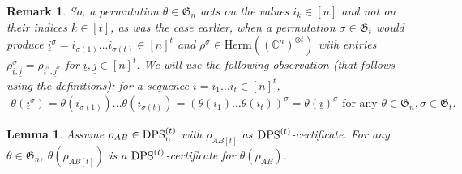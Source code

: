 \documentclass[11pt]{article}
\newcommand{\C}{\ensuremath{\mathbb{C}}} %
\newcommand{\Perm}{\mathfrak G}
\newcommand{\Herm}{\mathrm{Herm}}
\newcommand{\DPS}{\text{\rm DPS}}
\newcommand{\ot}{\otimes}
\newcommand{\ui}{\underline{i}}
\newcommand{\uj}{\underline{j}}
\theoremstyle{plain}
\newtheorem{lemma}[satz]{Lemma}
\newtheorem{remark}[satz]{Remark}
\newcommand{\ML}{\textcolor{blue}}
\begin{document}
\begin{remark}
So, a permutation $\theta\in\Perm_n$ acts on the values $i_k\in [n]$ and {\em not} on their indices  $k\in [t]$, as  was the case earlier, when a permutation $\sigma\in \Perm_{t}$ would produce 
$ \ui^\sigma=i_{\sigma(1)}\ldots i_{\sigma(t)}\in [n]^t$ and $\rho^\sigma\in\Herm((\C^n)^{\ot t})$ with entries
$\rho^\sigma_{\ui,\uj}=\rho_{\ui^\sigma,\uj^\sigma}$
for $\ui,\uj\in[n]^t$. We will use the  following observation (that follows using the definitions): for a sequence $\ui=i_1\ldots i_t\in [n]^t$,
\begin{align}\label{eq:theta-sigma}
\theta(\ui^\sigma) =\theta(i_{\sigma(1)})\ldots\theta(i_{\sigma(t)})= (\theta(i_1)\ldots\theta(i_t))^\sigma=\theta(\ui)^\sigma \text{ for any } \theta\in\Perm_n, \sigma\in \Perm_t.
\end{align}
\end{remark}


\begin{lemma}\label{LThetaAppliedDPSLCertificate}
 Assume $\rho_{AB}\in \DPS^{(t)}_n$ with $\rho_{AB[t]}$ as $\DPS^{(t)}$-certificate.
For any $\theta\in \Perm_n$,  $\theta(\rho_{AB[t]}) $ is a $\DPS^{(t)}$-certificate for $\theta(\rho_{AB})$.
\end{lemma}
\end{document}
